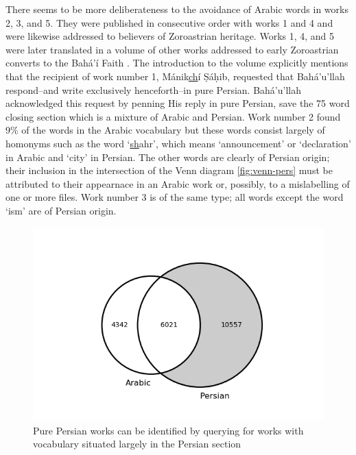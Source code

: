 \documentclass[12pt, oneside]{report}
\begin{document}
\par
There seems to be more deliberateness to the avoidance of Arabic words in works 2, 3, and 5. They were published in consecutive order with works 1 and 4 and were likewise addressed to believers of Zoroastrian heritage. Works 1, 4, and 5 were later translated in a volume of other works addressed to early Zoroastrian converts to the Bah\'{a}'\'{i} Faith \cite{bahaullah_tabernacle_2006}. The introduction to the volume explicitly mentions that the recipient of work number 1, M\'{a}nik\underline{ch}\'{i} Ṣ\'{a}ḥib, requested that Bah\'{a}'u'llah respond–and write exclusively henceforth–in pure Persian. Bah\'{a}'u'llah acknowledged this request by penning His reply in pure Persian, save the 75 word closing section which is a mixture of Arabic and Persian. Work number 2 found 9\% of the words in the Arabic vocabulary but these words consist largely of homonyms such as the word `\underline{sh}ahr', which means `announcement' or `declaration' in Arabic and `city' in Persian. The other words are clearly of Persian origin; their inclusion in the intersection of the Venn diagram \autoref{fig:venn-pers} must be attributed to their appearnace in an Arabic work or, possibly, to a mislabelling of one or more files. Work number 3 is of the same type; all words except the word `ism' are of Persian origin.
\begin{figure}
	\centering\captionsetup[subfigure]{justification=centering}
	\includegraphics[width=\linewidth]{figures/venn-persian.png}
	\caption[Venn diagram with Persian section highlighted]{Pure Persian works can be identified by querying for works with vocabulary situated largely in the Persian section}\label{fig:venn-pers}
\end{figure}
\end{document}
